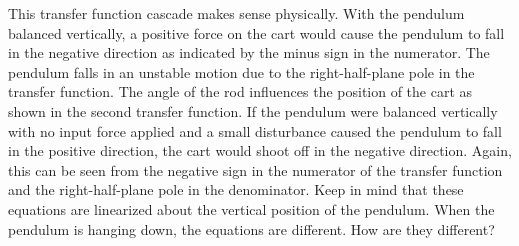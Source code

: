 This transfer function cascade makes sense physically. With the pendulum balanced vertically, a positive force on the cart would cause the pendulum to fall in the negative direction as indicated by the minus sign in the numerator. The pendulum falls in an unstable motion due to the right-half-plane pole in the transfer function. The angle of the rod influences the position of the cart as shown in the second transfer function. If the pendulum were balanced vertically with no input force applied and a small disturbance caused the pendulum to fall in the positive direction, the cart would shoot off in the negative direction. Again, this can be seen from the negative sign in the numerator of the transfer function and the right-half-plane pole in the denominator. Keep in mind that these equations are linearized about the vertical position of the pendulum. When the pendulum is hanging down, the equations are different. How are they different?